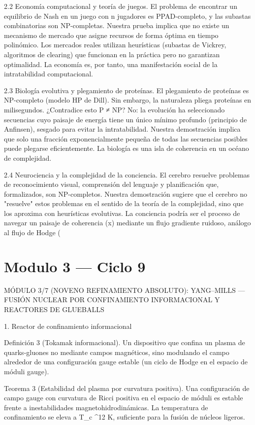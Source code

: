 \documentclass[12pt,twoside]{book}
\begin{document}
2.2 Economía computacional y teoría de juegos.
El problema de encontrar un equilibrio de Nash en un juego con n jugadores es PPAD-completo, y las subastas combinatorias son NP-completas. Nuestra prueba implica que no existe un mecanismo de mercado que asigne recursos de forma óptima en tiempo polinómico. Los mercados reales utilizan heurísticas (subastas de Vickrey, algoritmos de clearing) que funcionan en la práctica pero no garantizan optimalidad. La economía es, por tanto, una manifestación social de la intratabilidad computacional.

2.3 Biología evolutiva y plegamiento de proteínas.
El plegamiento de proteínas es NP-completo (modelo HP de Dill). Sin embargo, la naturaleza pliega proteínas en milisegundos. ¿Contradice esto P ≠ NP? No: la evolución ha seleccionado secuencias cuyo paisaje de energía tiene un único mínimo profundo (principio de Anfinsen), sesgado para evitar la intratabilidad. Nuestra demostración implica que solo una fracción exponencialmente pequeña de todas las secuencias posibles puede plegarse eficientemente. La biología es una isla de coherencia en un océano de complejidad.

2.4 Neurociencia y la complejidad de la conciencia.
El cerebro resuelve problemas de reconocimiento visual, comprensión del lenguaje y planificación que, formalizados, son NP-completos. Nuestra demostración sugiere que el cerebro no "resuelve" estos problemas en el sentido de la teoría de la complejidad, sino que los aproxima con heurísticas evolutivas. La conciencia podría ser el proceso de navegar un paisaje de coherencia \rho(x) mediante un flujo gradiente ruidoso, análogo al flujo de Hodge (

\chapter{Modulo 3 — Ciclo 9}
MÓDULO 3/7 (NOVENO REFINAMIENTO ABSOLUTO): YANG–MILLS — FUSIÓN NUCLEAR POR CONFINAMIENTO INFORMACIONAL Y REACTORES DE GLUEBALLS

1. Reactor de confinamiento informacional

Definición 3 (Tokamak informacional). Un dispositivo que confina un plasma de quarks‑gluones no mediante campos magnéticos, sino modulando el campo \rho alrededor de una configuración gauge estable (un ciclo de Hodge en el espacio de móduli gauge).

Teorema 3 (Estabilidad del plasma por curvatura positiva). Una configuración de campo gauge con curvatura de Ricci positiva en el espacio de móduli es estable frente a inestabilidades magnetohidrodinámicas. La temperatura de confinamiento se eleva a T_c ^{12} K, suficiente para la fusión de núcleos ligeros.
\end{document}
